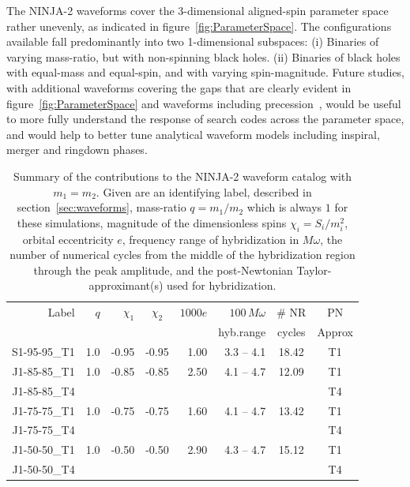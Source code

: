 The NINJA-2 waveforms cover the 3-dimensional aligned-spin parameter
space rather unevenly, as indicated in figure~\ref{fig:ParameterSpace}.
The configurations available fall predominantly into two 1-dimensional
subspaces: (i) Binaries of varying mass-ratio, but with non-spinning
black holes.  (ii) Binaries of black holes with equal-mass and
equal-spin, and with varying spin-magnitude. Future studies, with additional 
waveforms covering the gaps that are clearly evident in 
figure~\ref{fig:ParameterSpace} 
and waveforms including 
precession~\cite{Campanelli:2008nk,Mroue:2013xna,Hinder:2013oqa}, 
would be useful to more fully understand the 
response of search codes across the parameter space, and would help to better 
tune analytical waveform models including inspiral, merger and ringdown phases.
%
\begin{table}
\caption[Submissions to NINJA-2]{
\label{tab:ninja2_submissions1}
Summary of the contributions to the NINJA-2 waveform catalog with $m_1
= m_2$.  Given are an identifying label, described in
section~\ref{sec:waveforms}, mass-ratio $q=m_1/m_2$ which is always
$1$ for these simulations, magnitude of the dimensionless spins
$\chi_i=S_i/m_i^2$, orbital eccentricity $e$, frequency range of
hybridization in $M\omega$, the number of numerical cycles from the
middle of the hybridization region through the peak amplitude, and the
post-Newtonian Taylor-approximant(s) used for hybridization.
}
  \begin{tabular}{@{}rrrcrrcc}
      \hline
      Label & $q$ & $\chi_{1}$ & $\chi_{2}$ & $1000e$   & $100\,M\omega$ & \# NR 
& PN \\
      &    &     &            &            & hyb.range & cycles & Approx \\
      \hline
S1-95-95\_T1 & 1.0  &  -0.95  &  -0.95  &  1.00  &   3.3 -- 4.1  &  18.42  &  T1 
\\
J1-85-85\_T1 & 1.0  &  -0.85  &  -0.85  &  2.50  &   4.1 -- 4.7  &  12.09  & 
T1\\
J1-85-85\_T4 & & & & & & & T4 \\
J1-75-75\_T1 & 1.0  &  -0.75  &  -0.75  &  1.60  &   4.1 -- 4.7  &  13.42  & 
T1\\
J1-75-75\_T4 & & & & & & & T4 \\
J1-50-50\_T1 & 1.0  &  -0.50  &  -0.50  &  2.90  &   4.3 -- 4.7  &  15.12  & 
T1\\
J1-50-50\_T4 & & & & & & & T4 \\

\end{tabular}
\end{table}
